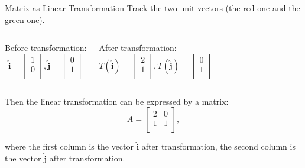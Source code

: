 \documentclass{beamer}
\begin{document}
\begin{frame}{Matrix as Linear Transformation}
\vspace{-3pt}
Track the two unit vectors (the red one and the green one).
\vspace{3pt}
\begin{columns}
\hspace{5pt}Before transformation:
\vspace{-3pt}
\begin{equation*}
    \boldsymbol{\hat{i}}=\left[ \begin{array}{c}
	1\\
	0\\
\end{array} \right] ,  \boldsymbol{\hat{j}}=\left[ \begin{array}{c}
	0\\
	1\\
\end{array} \right]
\end{equation*}

\hspace{5pt}After transformation:\
\vspace{-3pt}
\begin{equation*}
    T(\boldsymbol{\hat{i}})=\left[ \begin{array}{c}
	2\\
	1\\
\end{array} \right] ,  T(\boldsymbol{\hat{j}})=\left[ \begin{array}{c}
	0\\
	1\\
\end{array} \right]
\end{equation*}
\end{columns}
\vspace{3pt}
Then the linear transformation can be expressed by a matrix:
    \begin{equation*}
        A= \left[ \begin{matrix}
    	2&		0\\
    	1&		1\\
    \end{matrix} \right] ,
    \end{equation*}

where the first column is the vector $\boldsymbol{\hat{i}}$ after transformation, the second column is the vector $\boldsymbol{\hat{j}}$ after transformation.
\end{frame}
\end{document}
